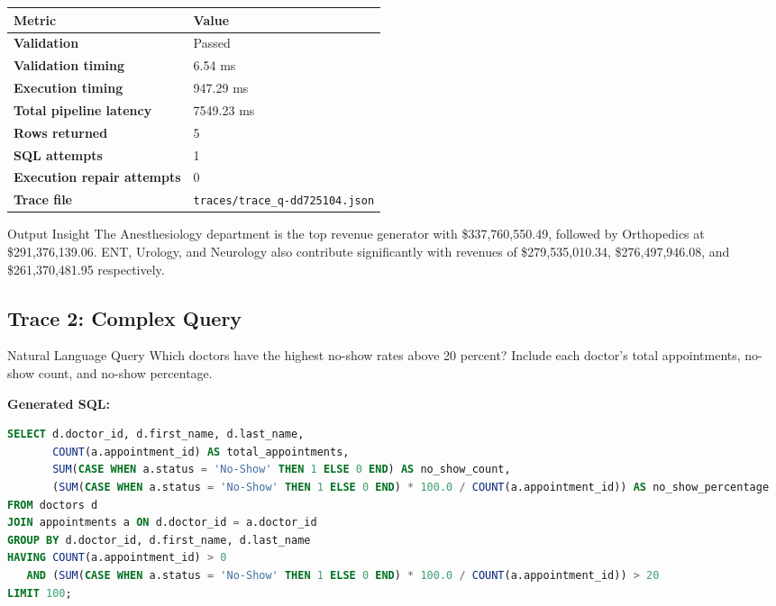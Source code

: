 \documentclass[11pt,a4paper]{article}
\begin{document}
\begin{table}[h!]
\centering
\begin{tabularx}{\textwidth}{>{\bfseries}l X}
\toprule
Metric & Value \\
\midrule
Validation & Passed \\
Validation timing & 6.54 ms \\
Execution timing & 947.29 ms \\
Total pipeline latency & 7549.23 ms \\
Rows returned & 5 \\
SQL attempts & 1 \\
Execution repair attempts & 0 \\
Trace file & \texttt{traces/trace\_q-dd725104.json} \\
\bottomrule
\end{tabularx}
\end{table}

\begin{successbox}{Output Insight}
The Anesthesiology department is the top revenue generator with \$337,760,550.49, followed by Orthopedics at \$291,376,139.06. ENT, Urology, and Neurology also contribute significantly with revenues of \$279,535,010.34, \$276,497,946.08, and \$261,370,481.95 respectively.
\end{successbox}

\subsection{Trace 2: Complex Query}

\begin{summarybox}{Natural Language Query}
Which doctors have the highest no-show rates above 20 percent? Include each doctor's total appointments, no-show count, and no-show percentage.
\end{summarybox}

\textbf{Generated SQL:}
\begin{lstlisting}[language=SQL]
SELECT d.doctor_id, d.first_name, d.last_name, 
       COUNT(a.appointment_id) AS total_appointments, 
       SUM(CASE WHEN a.status = 'No-Show' THEN 1 ELSE 0 END) AS no_show_count, 
       (SUM(CASE WHEN a.status = 'No-Show' THEN 1 ELSE 0 END) * 100.0 / COUNT(a.appointment_id)) AS no_show_percentage
FROM doctors d
JOIN appointments a ON d.doctor_id = a.doctor_id
GROUP BY d.doctor_id, d.first_name, d.last_name
HAVING COUNT(a.appointment_id) > 0
   AND (SUM(CASE WHEN a.status = 'No-Show' THEN 1 ELSE 0 END) * 100.0 / COUNT(a.appointment_id)) > 20
LIMIT 100;
\end{lstlisting}
\end{document}
